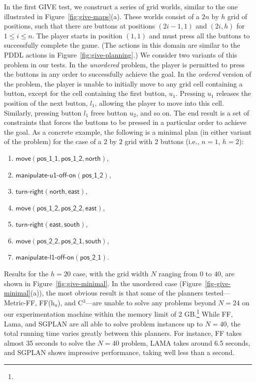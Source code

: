 In the first GIVE test, we construct a series of grid worlds, similar to the one
illustrated in Figure~\ref{fig:give-maps}(a). These worlds consist of a $2n$ by
$h$ grid of positions, such that there are buttons at positions $(2i-1,1)$ and
$(2i,h)$ for $1 \leq i \leq n$. The player starts in position $(1,1)$ and must
press all the buttons to successfully complete the game.  (The actions in this
domain are similar to the PDDL actions in Figure~\ref{fig:give-planning}.)
We consider two variants of this problem in our tests. In the \emph{unordered}
problem, the player is permitted to press the buttons in any order to
successfully achieve the goal. In the \emph{ordered} version of the problem, the
player is unable to initially move to any grid cell containing a button, except
for the cell containing the first button, $u_1$. Pressing $u_1$ releases the
position of the next button, $l_1$, allowing the player to move into this cell.
Similarly, pressing button $l_1$ frees button $u_2$, and so on. The end result
is a set of constraints that forces the buttons to be pressed in a particular
order to achieve the goal. As a concrete example, the following is a minimal
plan (in either variant of the problem) for the case of a $2$ by $2$ grid with
$2$ buttons (i.e., $n=1$, $h=2$):

\begin{enumerate}
\item $\mathsf{move}(\mathsf{pos\_1\_1},\mathsf{pos\_1\_2}, \mathsf{north})$,
\item $\mathsf{manipulate}\textsf{-}\mathsf{u1}\textsf{-}\mathsf{off}\textsf{-}\mathsf{on}(\mathsf{pos\_1\_2})$,
\item $\mathsf{turn}\textsf{-}\mathsf{right}(\mathsf{north}, \mathsf{east})$,
\item $\mathsf{move}(\mathsf{pos\_1\_2}, \mathsf{pos\_2\_2},
  \mathsf{east})$,
\item $\mathsf{turn}\textsf{-}\mathsf{right}(\mathsf{east}, \mathsf{south})$,
\item $\mathsf{move}(\mathsf{pos\_2\_2}, \mathsf{pos\_2\_1}, \mathsf{south})$,
\item $\mathsf{manipulate}\textsf{-}\mathsf{l1}\textsf{-}\mathsf{off}\textsf{-}\mathsf{on}(\mathsf{pos\_2\_1})$.
\end{enumerate}

Results for the $h=20$ case, with the grid width $N$ ranging from $0$ to $40$,
are shown in Figure~\ref{fig:give-minimal}. In the unordered case
(Figure~\ref{fig-give-minimal}(a)), the most obvious result is that some of the
planners tested---Metric-FF, FF(h$_a$), and C$^3$---are unable to solve any
problems beyond $N=24$ on our experimentation machine within the memory limit of
2 GB.\footnote{} While FF, Lama, and SGPLAN
are all able to solve problem instances up to $N=40$, the total running time
varies greatly between this planners. For instance, FF takes almost 35
seconds to solve the $N=40$ problem, LAMA takes around 6.5 seconds, and SGPLAN
shows impressive performance, taking well less than a second. 

